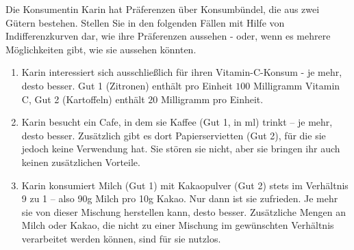 \begin{question}[subtitle={Graphische Darstellung von Präferenzen I}]
	Die Konsumentin Karin hat Präferenzen über Konsumbündel, die aus zwei Gütern bestehen. Stellen
	Sie in den folgenden Fällen mit Hilfe von Indifferenzkurven dar, wie ihre Präferenzen aussehen - oder,
	wenn es mehrere Möglichkeiten gibt, wie sie aussehen könnten.

	\begin{enumerate}
		\item Karin interessiert sich ausschließlich für ihren Vitamin-C-Konsum - je mehr, desto besser. Gut 1
		      (Zitronen) enthält pro Einheit $100$ Milligramm Vitamin C, Gut 2 (Kartoffeln) enthält $20$ Milligramm
		      pro Einheit.
		\item Karin besucht ein Cafe, in dem sie Kaffee (Gut 1, in ml) trinkt – je mehr, desto besser. Zusätzlich
		      gibt es dort Papierservietten (Gut 2), für die sie jedoch keine Verwendung hat. Sie stören sie nicht, aber sie bringen ihr auch keinen zusätzlichen Vorteile.
		\item Karin konsumiert Milch (Gut 1) mit Kakaopulver (Gut 2) stets im Verhältnis 9 zu 1 – also 90g Milch pro
		      10g Kakao. Nur dann ist sie zufrieden. Je mehr sie von dieser Mischung herstellen kann, desto besser.
		      Zusätzliche Mengen an Milch oder Kakao, die nicht zu einer Mischung im gewünschten Verhältnis
		      verarbeitet werden können, sind für sie nutzlos.
	\end{enumerate}

\end{question}

